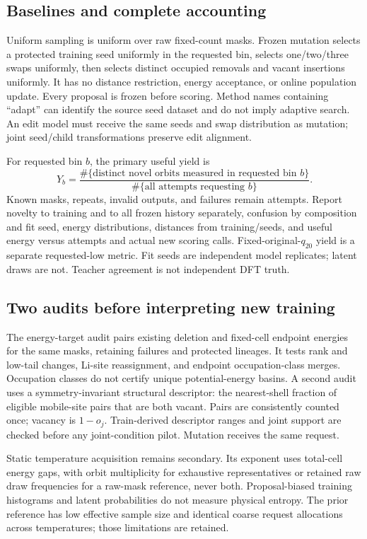 \documentclass[10pt]{article}
\begin{document}
\subsection{Baselines and complete accounting}
Uniform sampling is uniform over raw fixed-count masks. Frozen mutation selects
a protected training seed uniformly in the requested bin, selects one/two/three
swaps uniformly, then selects distinct occupied removals and vacant insertions
uniformly. It has no distance restriction, energy acceptance, or online population
update. Every proposal is frozen before scoring. Method names containing
``adapt'' can identify the source seed dataset and do not imply adaptive search.
An edit model must receive the same seeds and swap distribution as mutation;
joint seed/child transformations preserve edit alignment.

For requested bin $b$, the primary useful yield is
\begin{equation}
Y_b=\frac{\#\{\text{distinct novel orbits measured in requested bin }b\}}
{\#\{\text{all attempts requesting }b\}}.
\end{equation}
Known masks, repeats, invalid outputs, and failures remain attempts. Report
novelty to training and to all frozen history separately, confusion by composition
and fit seed, energy distributions, distances from training/seeds, and useful
energy versus attempts and actual new scoring calls. Fixed-original-$q_{20}$
yield is a separate requested-low metric. Fit seeds are independent model
replicates; latent draws are not. Teacher agreement is not independent DFT truth.

\subsection{Two audits before interpreting new training}
The energy-target audit pairs existing deletion and fixed-cell endpoint energies
for the same masks, retaining failures and protected lineages. It tests rank and
low-tail changes, Li-site reassignment, and endpoint occupation-class merges.
Occupation classes do not certify unique potential-energy basins. A second audit
uses a symmetry-invariant structural descriptor: the nearest-shell fraction of
eligible mobile-site pairs that are both vacant. Pairs are consistently counted
once; vacancy is $1-o_j$. Train-derived descriptor ranges and joint support are
checked before any joint-condition pilot. Mutation receives the same request.

Static temperature acquisition remains secondary. Its exponent uses total-cell
energy gaps, with orbit multiplicity for exhaustive representatives or retained
raw draw frequencies for a raw-mask reference, never both. Proposal-biased
training histograms and latent probabilities do not measure physical entropy.
The prior reference has low effective sample size and identical coarse request
allocations across temperatures; those limitations are retained.
\newpage
\end{document}
